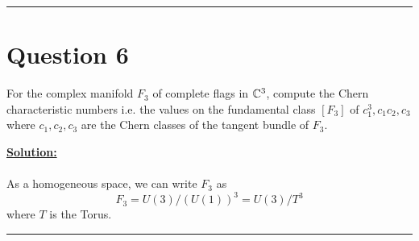 \documentclass[11pt]{article}
\begin{document}
\vskip 0.5cm
\hrule
\pagebreak




\section{Question 6}
\begin{bluebox}
  For the complex manifold $F_3$ of complete flags in $\mathbb{C}^3$, compute the Chern characteristic numbers i.e. the values on the fundamental class $[F_3]$ of $c_1^3, c_1 c_2, c_3$ where $c_1, c_2, c_3$ are the Chern classes of the tangent bundle of $F_3$.
\end{bluebox}

\vskip 0.5cm
\textbf{\underline{Solution:}}
\\
\\
As a homogeneous space, we can write $F_3$ as $$ F_3 = U(3)/ (U(1))^3 = U(3) / T^3 $$ where $T$ is the Torus. 
\vskip 0.5cm
\hrule
\pagebreak






% 
\end{document}
